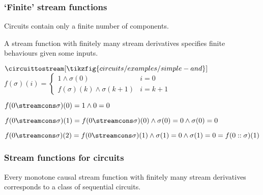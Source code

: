 \begin{frame}
    \frametitle{`Finite' stream functions}

    Circuits contain only a finite number of components.

    A stream function with \alert{finitely many stream derivatives} specifies finite behaviours given some inputs.

    \vspace{1em}

    \begin{center}
        \(
            \circuittostream[\tikzfig{circuits/examples/simple-and}]{}
        \)
        \qquad
        \(
            f(\sigma)(i) =
            \begin{cases}
                1 \land \sigma(0) & i = 0 \\
                f(\sigma)(k) \land \sigma(k+1) & i = k+1
                
            \end{cases}
        \)
        \wait

        \vspace{1.5em}

        \(
            f(0 \streamcons \sigma)(0) = 1 \land 0 = 0
        \)
        \wait

        \(
            f(0 \streamcons \sigma)(1) = f(0 \streamcons \sigma)(0) \land \sigma(0) = 0 \land \sigma(0) = 0
        \)\wait
        
        \(
            f(0 \streamcons \sigma)(2) = f(0 \streamcons \sigma)(1) \land \sigma(1) = 0 \land \sigma(1) = 0 = f(0 :: \sigma)(1)
        \)
    \end{center}

\end{frame}

\begin{frame}
    \frametitle{Stream functions for circuits}
    \begin{theorem}
        Every monotone causal stream function with finitely many stream derivatives corresponds to a class of sequential circuits. 
    \end{theorem}
\end{frame}